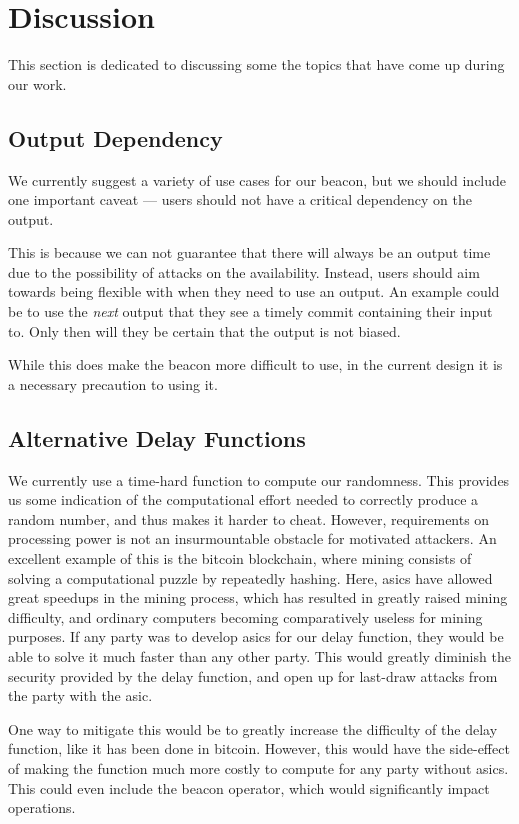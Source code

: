 \section{Discussion}%
\label{sec:discussion}
This section is dedicated to discussing some the topics that have come up during our work.

\subsection{Output Dependency}
We currently suggest a variety of use cases for our beacon, but we should include one important caveat --- users should not have a critical dependency on the output.

This is because we can not guarantee that there will always be an output time due to the possibility of attacks on the availability.
Instead, users should aim towards being flexible with when they need to use an output. An example could be to use the \textit{next} output that they see a timely commit containing their input to. Only then will they be certain that the output is not biased.

While this does make the beacon more difficult to use, in the current design it is a necessary precaution to using it.

\subsection{Alternative Delay Functions}
We currently use a time-hard function to compute our randomness. This provides us some indication of the computational effort needed to correctly produce a random number, and thus makes it harder to cheat.
However, requirements on processing power is not an insurmountable obstacle for motivated attackers. An excellent example of this is the bitcoin blockchain, where mining consists of solving a computational puzzle by repeatedly hashing. Here, \acrfull{asic}s have allowed great speedups in the mining process, which has resulted in greatly raised mining difficulty, and ordinary computers becoming comparatively useless for mining purposes.
If any party was to develop \acrshort{asic}s for our delay function, they would be able to solve it much faster than any other party. This would greatly diminish the security provided by the delay function, and open up for last-draw attacks from the party with the \acrshort{asic}.

One way to mitigate this would be to greatly increase the difficulty of the delay function, like it has been done in bitcoin. However, this would have the side-effect of making the function much more costly to compute for any party without \acrshort{asic}s. This could even include the beacon operator, which would significantly impact operations.


